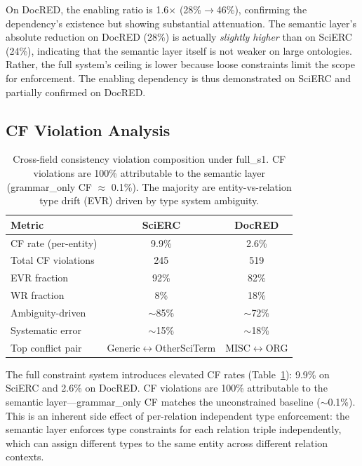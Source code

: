 \documentclass[11pt,a4paper]{article}
\begin{document}
On DocRED, the enabling ratio is 1.6$\times$ (28\%$\to$46\%), confirming the dependency's existence but showing substantial attenuation.
The semantic layer's absolute reduction on DocRED (28\%) is actually \emph{slightly higher} than on SciERC (24\%), indicating that the semantic layer itself is not weaker on large ontologies.
Rather, the full system's ceiling is lower because loose constraints limit the scope for enforcement.
The enabling dependency is thus demonstrated on SciERC and partially confirmed on DocRED.

\subsection{CF Violation Analysis}

\begin{table}[t]
\centering
\small
\begin{tabular}{lcc}
\toprule
\textbf{Metric} & \textbf{SciERC} & \textbf{DocRED} \\
\midrule
CF rate (per-entity) & 9.9\% & 2.6\% \\
Total CF violations & 245 & 519 \\
EVR fraction & 92\% & 82\% \\
WR fraction & 8\% & 18\% \\
Ambiguity-driven & $\sim$85\% & $\sim$72\% \\
Systematic error & $\sim$15\% & $\sim$18\% \\
Top conflict pair & Generic$\leftrightarrow$OtherSciTerm & MISC$\leftrightarrow$ORG \\
\bottomrule
\end{tabular}
\caption{Cross-field consistency violation composition under full\_s1. CF violations are 100\% attributable to the semantic layer (grammar\_only CF $\approx$ 0.1\%). The majority are entity-vs-relation type drift (EVR) driven by type system ambiguity.}
\label{tab:cf-analysis}
\end{table}

The full constraint system introduces elevated CF rates (Table~\ref{tab:cf-analysis}): 9.9\% on SciERC and 2.6\% on DocRED.
CF violations are 100\% attributable to the semantic layer---grammar\_only CF matches the unconstrained baseline ($\sim$0.1\%).
This is an inherent side effect of per-relation independent type enforcement: the semantic layer enforces type constraints for each relation triple independently, which can assign different types to the same entity across different relation contexts.
\end{document}
